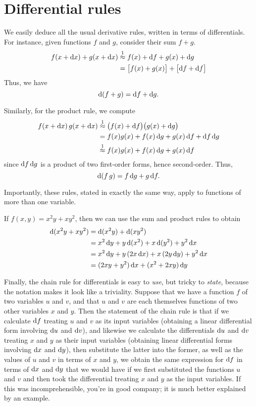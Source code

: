 \documentclass[12pt]{amsart}
\begin{document}
\section{Differential rules}
\label{sec:differential-rules}

We easily deduce all the usual derivative rules, written in terms of differentials.
For instance, given functions $f$ and $g$, consider their sum $f+g$.
\begin{align*}
  f(x+\mathrm{d} x) + g(x+\mathrm{d} x)
  &\mathrel{\overset{1}{\approx}} f(x) + \mathrm{d} f + g(x) + \mathrm{d} g\\
  &= \big[f(x) + g(x)\big] + \big[ \mathrm{d} f + \mathrm{d} f \big]
\end{align*}
Thus, we have
\[ \mathrm{d}(f+g) = \mathrm{d} f + \mathrm{d} g. \]

Similarly, for the product rule, we compute
\begin{align*}
  f(x+\mathrm{d} x) \, g(x+\mathrm{d} x)
  &\mathrel{\overset{1}{\approx}} \big(f(x)+\mathrm{d} f\big)\big(g(x) + \mathrm{d} g \big)\\
  &= f(x) g(x) + f(x) \,\mathrm{d} g + g(x) \,\mathrm{d} f + \mathrm{d} f\,\mathrm{d} g\\
  &\mathrel{\overset{1}{\approx}} f(x) g(x) + f(x) \,\mathrm{d} g + g(x) \,\mathrm{d} f
\end{align*}
since $\mathrm{d} f\,\mathrm{d} g$ is a product of two first-order forms, hence second-order.
Thus,
\[ \mathrm{d}(f\,g) = f\,\mathrm{d} g + g\,\mathrm{d} f.\]

Importantly, these rules, stated in exactly the same way, apply to functions of more than one variable.
\begin{eg}\label{eg:twovar-differential}
  If $f(x,y) = x^2y + xy^2$, then we can use the sum and product rules to obtain
  \begin{align*}
    \mathrm{d}(x^2y + xy^2) &= \mathrm{d}(x^2y) + \mathrm{d}(xy^2)\\
    &= x^2\,\mathrm{d} y + y \,\mathrm{d}(x^2) + x \,\mathrm{d}(y^2) + y^2\,\mathrm{d} x\\
    &= x^2\,\mathrm{d} y + y \,(2x\,\mathrm{d} x) + x\, (2y\,\mathrm{d} y) + y^2\,\mathrm{d} x\\
    &= (2xy + y^2)\,\mathrm{d} x + (x^2+2xy)\,\mathrm{d} y
  \end{align*}
\end{eg}

Finally, the chain rule for differentials is easy to \emph{use}, but tricky to \emph{state}, because the notation makes it look like a triviality.
Suppose that we have a function $f$ of two variables $u$ and $v$, and that $u$ and $v$ are each themselves functions of two other variables $x$ and $y$.
Then the statement of the chain rule is that if we calculate $\mathrm{d} f$ treating $u$ and $v$ as its input variables (obtaining a linear differential form involving $\mathrm{d} u$ and $\mathrm{d} v$), and likewise we calculate the differentials $\mathrm{d} u$ and $\mathrm{d} v$ treating $x$ and $y$ as their input variables (obtaining linear differential forms involving $\mathrm{d} x$ and $\mathrm{d} y$), then substitute the latter into the former, as well as the values of $u$ and $v$ in terms of $x$ and $y$, we obtain the same expression for $\mathrm{d} f$ in terms of $\mathrm{d} x$ and $\mathrm{d} y$ that we would have if we first substituted the functions $u$ and $v$ and then took the differential treating $x$ and $y$ as the input variables.
If this was incomprehensible, you're in good company; it is much better explained by an example.
\end{document}
